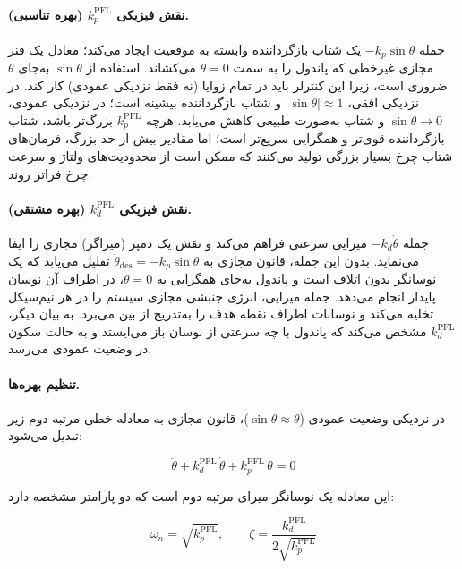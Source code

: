 \paragraph{نقش فیزیکی $k_p^{\text{PFL}}$ (بهره تناسبی).}
جمله $-k_p \sin\theta$ یک شتاب بازگرداننده وابسته به موقعیت ایجاد می‌کند؛ معادل یک فنر مجازی غیرخطی که پاندول را به سمت $\theta = 0$ می‌کشاند. استفاده از $\sin\theta$ به‌جای $\theta$ ضروری است، زیرا این کنترلر باید در تمام زوایا (نه فقط نزدیکی عمودی) کار کند. در نزدیکی افقی، $|\sin\theta| \approx 1$ و شتاب بازگرداننده بیشینه است؛ در نزدیکی عمودی، $\sin\theta \to 0$ و شتاب به‌صورت طبیعی کاهش می‌یابد. هرچه $k_p^{\text{PFL}}$ بزرگ‌تر باشد، شتاب بازگرداننده قوی‌تر و همگرایی سریع‌تر است؛ اما مقادیر بیش از حد بزرگ، فرمان‌های شتاب چرخ بسیار بزرگی تولید می‌کنند که ممکن است از محدودیت‌های ولتاژ و سرعت چرخ فراتر روند.

\paragraph{نقش فیزیکی $k_d^{\text{PFL}}$ (بهره مشتقی).}
جمله $-k_d \dot\theta$ میرایی سرعتی فراهم می‌کند و نقش یک دمپر (میراگر) مجازی را ایفا می‌نماید. بدون این جمله، قانون مجازی به $\ddot\theta_{\text{des}} = -k_p \sin\theta$ تقلیل می‌یابد که یک نوسانگر بدون اتلاف است و پاندول به‌جای همگرایی به $\theta = 0$، در اطراف آن نوسان پایدار انجام می‌دهد. جمله میرایی، انرژی جنبشی مجازی سیستم را در هر نیم‌سیکل تخلیه می‌کند و نوسانات اطراف نقطه هدف را به‌تدریج از بین می‌برد. به بیان دیگر، $k_d^{\text{PFL}}$ مشخص می‌کند که پاندول با چه سرعتی از نوسان باز می‌ایستد و به حالت سکون در وضعیت عمودی می‌رسد.

\paragraph{تنظیم بهره‌ها.}
در نزدیکی وضعیت عمودی ($\sin\theta \approx \theta$)، قانون مجازی به معادله خطی مرتبه دوم زیر تبدیل می‌شود:

\begin{equation}
    \ddot\theta + k_d^{\text{PFL}}\, \dot\theta + k_p^{\text{PFL}}\, \theta = 0
\end{equation}

این معادله یک نوسانگر میرای مرتبه دوم است که دو پارامتر مشخصه دارد:

\begin{equation}
    \omega_n = \sqrt{k_p^{\text{PFL}}}, \qquad \zeta = \frac{k_d^{\text{PFL}}}{2\sqrt{k_p^{\text{PFL}}}}
\end{equation}

